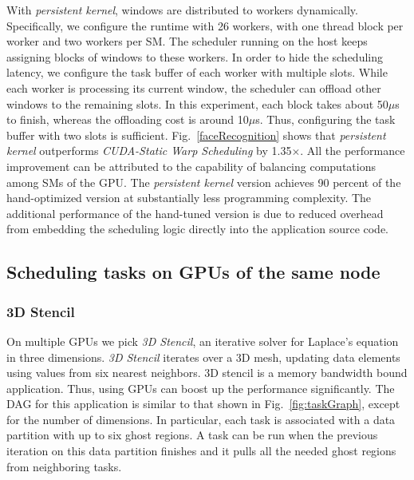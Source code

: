 With {\em persistent kernel}, windows are distributed to workers dynamically.
Specifically, we configure the runtime with 26 workers, with one thread block per worker and two workers per SM.
The scheduler running on the host keeps assigning blocks of windows to these workers.
In order to hide the scheduling latency, we configure the task buffer of each worker with multiple slots.
While each worker is processing its current window, the scheduler can offload other windows to the remaining slots.
In this experiment, each block takes about 50$\mu$s to finish, whereas the offloading cost is around 10$\mu$s.
Thus, configuring the task buffer with two slots is sufficient.
Fig.~\ref{faceRecognition} shows that {\em persistent kernel} outperforms {\em CUDA-Static Warp Scheduling} by 1.35$\times$.
All the performance improvement can be attributed to the capability of balancing computations among SMs of the GPU.
The {\em persistent kernel} version achieves 90 percent of the hand-optimized version at substantially less programming complexity.
The additional performance of the hand-tuned version is due to reduced overhead from embedding the scheduling logic directly into the application source code.

\subsection{Scheduling tasks on GPUs of the same node}
\subsubsection{3D Stencil}
\label{subsec:3DStencil_1node}
On multiple GPUs we pick {\em 3D Stencil}, an iterative solver for Laplace's equation in three dimensions.
{\em 3D Stencil} iterates over a 3D mesh, updating data elements using values from six nearest neighbors.
3D stencil is a memory bandwidth bound application. 
Thus, using GPUs can boost up the performance significantly.
The DAG for this application is similar to that shown in Fig.~\ref{fig:taskGraph}, except for the number of dimensions.
In particular, each task is associated with a data partition with up to six ghost regions.
A task can be run when the previous iteration on this data partition finishes and it pulls all the needed ghost regions from neighboring tasks.


